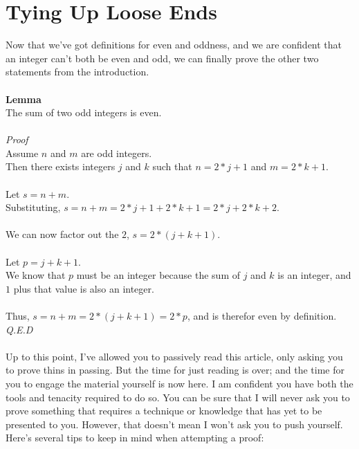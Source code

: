 \documentclass[a4paper,12pt]{article}
\begin{document}
\section{Tying Up Loose Ends}
Now that we've got definitions for even and oddness, and we are confident that an integer can't both be even and odd, we can finally prove the other two statements from the introduction.\\
\\
\textbf{Lemma}\\  
The sum of two odd integers is even.\\
\\
\textit{Proof}\\
Assume $n$ and $m$ are odd integers.\\
Then there exists integers $j$ and $k$ such that $n = 2*j + 1$ and $m = 2*k + 1$.\\
\\
Let $s = n + m$.\\
Substituting, $s = n + m = 2*j + 1 + 2*k + 1 = 2*j + 2*k + 2$.\\
\\
We can now factor out the $2$, $s = 2*(j + k + 1)$.\\
\\
Let $p = j + k + 1$.\\
We know that $p$ must be an integer because the sum of $j$ and $k$ is an integer, and $1$ plus that value is also an integer.\\
\\
Thus, $s = n + m = 2*(j + k + 1) = 2*p$, and is therefor even by definition.\\
\textit{Q.E.D}\\
\\
Up to this point, I've allowed you to passively read this article, only asking you to prove thins in passing. But the time for just reading is over; and the time for you to engage the material yourself is now here. I am confident you have both the tools and tenacity required to do so. You can be sure that I will never ask you to prove something that requires a technique or knowledge that has yet to be presented to you. However, that doesn't mean I won't ask you to push yourself. Here's several tips to keep in mind when attempting a proof:
\end{document}
